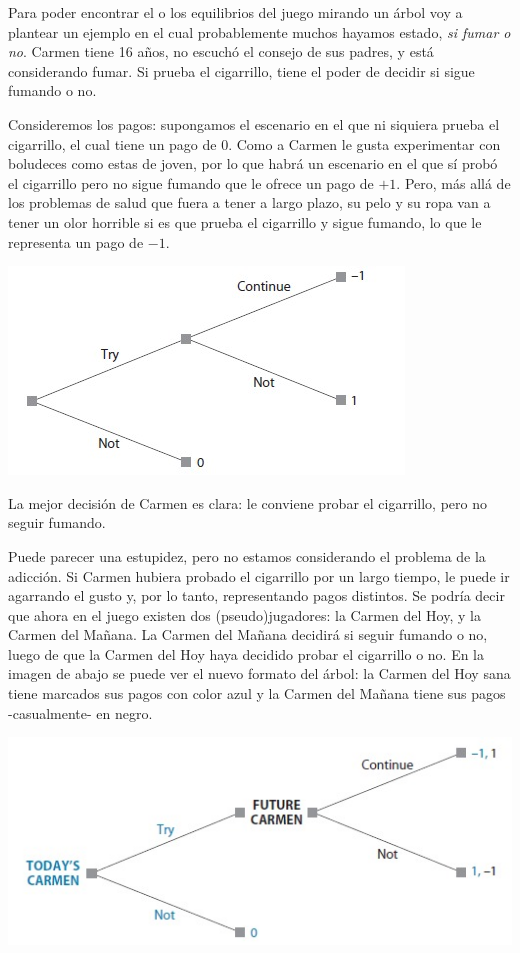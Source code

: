 \documentclass{article}
\begin{document}
        Para poder encontrar el o los equilibrios del juego mirando un árbol voy a plantear un ejemplo en el cual probablemente muchos hayamos estado, \emph{si fumar o no}. Carmen tiene 16 años, no escuchó el consejo de sus padres, y está considerando fumar. Si prueba el cigarrillo, tiene el poder de decidir si sigue fumando o no.

        Consideremos los pagos: supongamos el escenario en el que ni siquiera prueba el cigarrillo, el cual tiene un pago de $0$. Como a Carmen le gusta experimentar con boludeces como estas de joven, por lo que habrá un escenario en el que sí probó el cigarrillo pero no sigue fumando que le ofrece un pago de $+1$. Pero, más allá de los problemas de salud que fuera a tener a largo plazo, su pelo y su ropa van a tener un olor horrible si es que prueba el cigarrillo y sigue fumando, lo que le representa un pago de $-1$.

        \begin{center}
            \includegraphics[width=0.5\linewidth]{figs/fig14.jpeg}
        \end{center}

        La mejor decisión de Carmen es clara: le conviene probar el cigarrillo, pero no seguir fumando.

        Puede parecer una estupidez, pero no estamos considerando el problema de la adicción. Si Carmen hubiera probado el cigarrillo por un largo tiempo, le puede ir agarrando el gusto y, por lo tanto, representando pagos distintos. Se podría decir que ahora en el juego existen dos (pseudo)jugadores: la Carmen del Hoy, y la Carmen del Mañana. La Carmen del Mañana decidirá si seguir fumando o no, luego de que la Carmen del Hoy haya decidido probar el cigarrillo o no. En la imagen de abajo se puede ver el nuevo formato del árbol: la Carmen del Hoy sana tiene marcados sus pagos con color azul y la Carmen del Mañana tiene sus pagos -casualmente- en negro.

        \begin{center}
            \includegraphics[width=0.5\linewidth]{figs/fig15.jpeg}
        \end{center}
\end{document}
